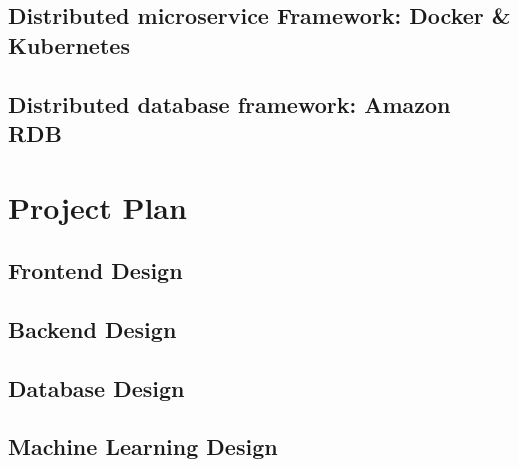 \documentclass[12pt,two side]{report}
\begin{document}
\section{Distributed microservice Framework: Docker \& Kubernetes}
\section{Distributed database framework: Amazon RDB}

\chapter{Project Plan}
\section{Frontend Design}
\section{Backend Design}
\section{Database Design}
\section{Machine Learning Design}




\end{document}
